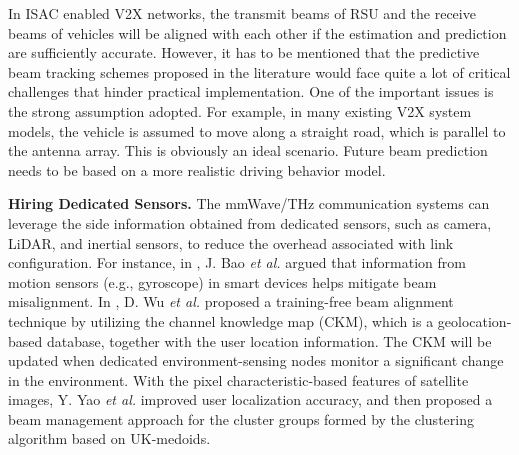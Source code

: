 \documentclass[journal,comsoc]{IEEEtran}
\begin{document}
In ISAC enabled V2X networks, the transmit beams of RSU and the receive beams of vehicles will be aligned with each other if the estimation and prediction are sufficiently accurate. However, it has to be mentioned that the predictive beam tracking schemes proposed in the literature would face quite a lot of critical challenges that hinder practical implementation. One of the important issues is the strong assumption adopted. For example, in many existing V2X system models, the vehicle is assumed to move along a straight road, which is parallel to the antenna array. This is obviously an ideal scenario. Future beam prediction needs to be based on a more realistic driving behavior model.


{\bf{Hiring Dedicated Sensors.}} The mmWave/THz communication systems can leverage the side information obtained from dedicated sensors, such as camera, LiDAR, and inertial sensors, to reduce the overhead associated with link configuration. For instance, in \cite{Motion-Sensor-Beam-Tracking-2018}, J. Bao \emph{et al.} argued that information from motion sensors (e.g., gyroscope) in smart devices helps mitigate beam misalignment. In \cite{Environment-Aware-Beam-Alignment-2021}, D. Wu \emph{et al.} proposed a training-free beam alignment technique by utilizing the channel knowledge map (CKM), which is a geolocation-based database, together with the user location information. The CKM will be updated when dedicated environment-sensing nodes monitor a significant change in the environment. With the pixel characteristic-based features of satellite images, Y. Yao \emph{et al.} \cite{Joint-Sensing-Communications-DRL-2022} improved user localization accuracy, and then proposed a beam management approach for the cluster groups formed by the clustering algorithm based on UK-medoids.
\end{document}
